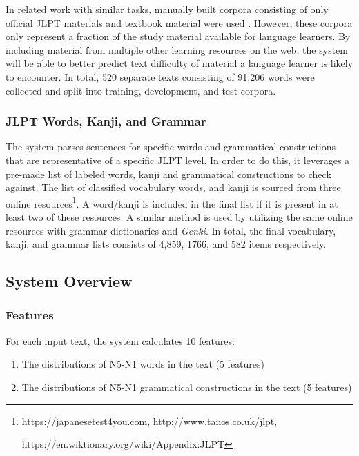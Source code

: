 \documentclass[12pt, a4paper]{article}
\begin{document}
In related work with similar tasks, manually built corpora consisting of only official JLPT materials and textbook material
were used \citep{grammarTemplate}. However, these corpora only represent a fraction of the study material available for language learners. By including material from multiple
other learning resources on the web, the system will be able to better predict text difficulty of material a language learner is likely
to encounter. 
In total, 520 separate texts consisting of 91,206 words were collected and split into training, development, and test corpora.

\subsubsection{JLPT Words, Kanji, and Grammar}

The system parses sentences for specific words and grammatical constructions that are representative
of a specific JLPT level. In order to do this, it leverages a pre-made list of labeled words, kanji and 
grammatical constructions to check against. The list of classified vocabulary words, and kanji is sourced from 
three online resources\footnote[4]{https://japanesetest4you.com, http://www.tanos.co.uk/jlpt, \par https://en.wiktionary.org/wiki/Appendix:JLPT}.
A word/kanji is included in the final list if it is present in at least two of these resources. A similar method is 
used by utilizing the same online resources with grammar dictionaries \citep{IntermediateGrammar, AdvancedGrammar} and \textit{Genki}.
In total, the final vocabulary, kanji, and grammar lists consists of 4,859, 1766, and 582 items respectively.

\subsection{System Overview}

\subsubsection{Features}

For each input text, the system calculates 10 features:
\begin{enumerate}
    \item The distributions of N5-N1 words in the text (5 features)
    \item The distributions of N5-N1 grammatical constructions in the text (5 features)
\end{enumerate}
\end{document}
